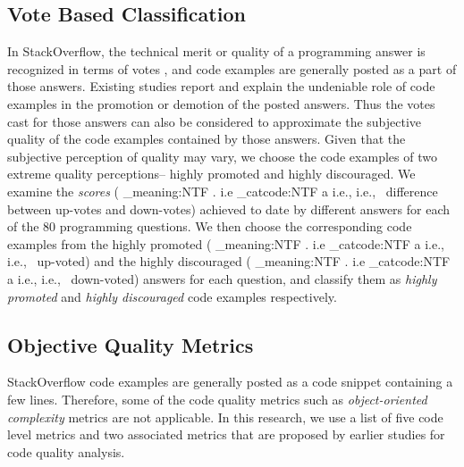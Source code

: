 \documentclass[conference]{IEEEtran}
\makeatletter
\newcommand\latinabbrev[1]{
  \peek_meaning:NTF . {%
    #1\@}%
  { \peek_catcode:NTF a {%
      #1., \@ }%
    {#1., \@}}}
\def\eg{\latinabbrev{e.g}}
\def\ie{\latinabbrev{i.e}}
\makeatother
\begin{document}
\subsection{Vote Based Classification}\label{sec:voteclass}
In StackOverflow, the technical merit or quality of a programming answer is recognized in terms of votes \cite{nasehi}, and code examples are generally posted as a part of those answers. Existing studies \cite{nasehi, nier} report and explain the undeniable role of code examples in the promotion or demotion of the posted answers. Thus the votes cast for those answers can also be considered to approximate the subjective quality of the code examples contained by those answers. Given that the subjective perception of quality may vary, we choose the code examples of two extreme quality perceptions-- highly promoted and highly discouraged. We examine the \emph{scores} (\ie\ difference between up-votes and down-votes) 
achieved to date by different answers for each of the 80 programming questions. We then choose the corresponding code examples from the highly promoted (\ie\ up-voted) and the highly discouraged (\ie\ down-voted) answers for each question, and classify them as \emph{highly promoted} and \emph{highly discouraged} code examples respectively.
\vspace{-.1cm}
\subsection{Objective Quality Metrics}
\label{sec:metrics}
StackOverflow code examples are generally posted as a code snippet containing a few lines. 
Therefore, some of the code quality metrics such as \emph{object-oriented complexity} metrics are not applicable.
In this research, we use a list of five code level metrics and two associated metrics that are proposed by earlier studies for code quality analysis.
\end{document}
